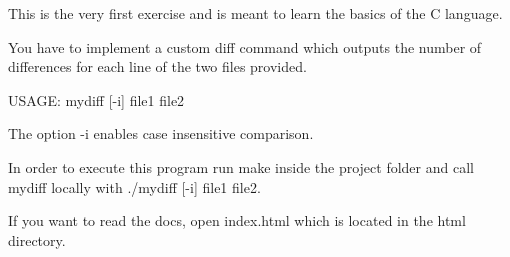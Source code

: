 This is the very first exercise and is meant to learn the basics of the C language.

You have to implement a custom {\ttfamily diff} command which outputs the number of differences for each line of the two files provided.

U\+S\+A\+GE\+: {\ttfamily mydiff \mbox{[}-\/i\mbox{]} file1 file2}

The option {\ttfamily -\/i} enables case insensitive comparison.

In order to execute this program run {\ttfamily make} inside the project folder and call mydiff locally with {\ttfamily ./mydiff \mbox{[}-\/i\mbox{]} file1 file2}.

If you want to read the docs, open {\ttfamily index.\+html} which is located in the html directory. 